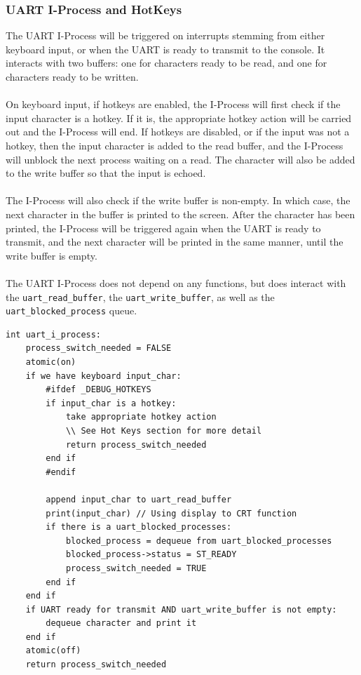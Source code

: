 \documentclass[titlepage]{article}
\begin{document}
\subsubsection{UART I-Process and HotKeys}
The UART I-Process will be triggered on interrupts stemming from either keyboard
input, or when the UART is ready to transmit to the console.  It interacts with
two buffers: one for characters ready to be read, and one for characters ready
to be written.\\
\\
On keyboard input, if hotkeys are enabled, the I-Process will first check if the
input character is a hotkey.  If it is, the appropriate hotkey action will be
carried out and the I-Process will end.  If hotkeys are disabled, or if the
input was not a hotkey, then the input character is added to the read buffer,
and the I-Process will unblock the next process waiting on a read.  The
character will also be added to the write buffer so that the input is echoed.\\
\\
The I-Process will also check if the write buffer is non-empty.  In which case,
the next character in the buffer is printed to the screen.  After the character
has been printed, the I-Process will be triggered again when the UART is ready
to transmit, and the next character will be printed in the same manner, until
the write buffer is empty.\\
\\
The UART I-Process does not depend on any functions, but does interact with the
\verb!uart_read_buffer!, the \verb!uart_write_buffer!, as well as the
\verb!uart_blocked_process! queue.

\begin{verbatim}
int uart_i_process:
    process_switch_needed = FALSE
    atomic(on)
    if we have keyboard input_char:
        #ifdef _DEBUG_HOTKEYS
        if input_char is a hotkey:
            take appropriate hotkey action
            \\ See Hot Keys section for more detail
            return process_switch_needed
        end if
        #endif

        append input_char to uart_read_buffer
        print(input_char) // Using display to CRT function
        if there is a uart_blocked_processes:
            blocked_process = dequeue from uart_blocked_processes
            blocked_process->status = ST_READY
            process_switch_needed = TRUE
        end if
    end if
    if UART ready for transmit AND uart_write_buffer is not empty:
        dequeue character and print it
    end if
    atomic(off)
    return process_switch_needed
\end{verbatim}
\end{document}
